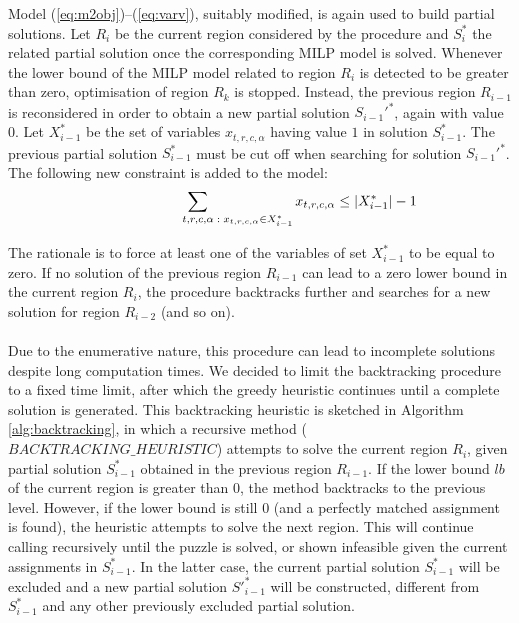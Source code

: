 \documentclass[preprint,12pt]{elsarticle}
\begin{document}
{Model (\ref{eq:m2obj})--(\ref{eq:varv}), suitably modified, is again used to build partial solutions.
Let $R_i$ be the current region considered by the procedure and $S_{i}^\ast$ the related partial solution once the corresponding MILP model is solved.
Whenever the lower bound of the MILP model related to region $R_i$ is detected to be greater than zero, optimisation of region $R_k$ is stopped.
Instead, the previous region $R_{i-1}$ is reconsidered in order to obtain a new partial solution 
$S_{i-1}'^\ast$, again with value $0$. Let $X_{i-1}^*$ be the set of variables ${x}_{t,r,c,\alpha}$
having value $1$ in solution $S_{i-1}^*$.
The previous partial solution $S_{i-1}^\ast$ must be cut off when searching for solution $S_{i-1}'^\ast$. The following new constraint is added to the model:
\begin{equation}
\sum_{\hspace*{2cm} t,r,c,\alpha \; : \; x_{t,r,c,\alpha} \in X_{i-1}^*}  x_{t,r,c,\alpha} \leq |X_{i-1}^*|-1 
\end{equation}

\noindent
The rationale is to force at least one of the variables of set $X_{i-1}^*$ to be equal to zero.
If no solution of the previous region $R_{i-1}$ can lead to a zero lower bound in the current region $R_i$, the procedure backtracks further and searches for a new solution for region $R_{i-2}$ (and so on). 
\\
\\
Due to the enumerative nature, this procedure can lead to incomplete solutions despite long computation times.
We decided to limit the backtracking procedure to a fixed time limit, after which the greedy heuristic continues until a complete solution is generated.
This backtracking heuristic is sketched in Algorithm \ref{alg:backtracking}, in which a recursive method ($BACKTRACKING\_HEURISTIC$) attempts to solve the current region $R_i$, given partial solution $S^\ast_{i-1}$ 
obtained in the previous region $R_{i-1}$.
If the lower bound $lb$ of the current region  is greater than 0, the method backtracks to the previous level.
However, if the lower bound is still $0$ (and a perfectly matched assignment is found), the heuristic attempts to solve the next region. This will continue calling recursively until the puzzle is solved, or shown infeasible given the current assignments in $S^\ast_{i-1}$.
In the latter case, the current partial solution $S^\ast_{i-1}$ will be excluded and a new partial solution $S'^\ast_{i-1}$ will be constructed, different from $S^\ast_{i-1}$ and any other previously excluded partial solution.

}
\end{document}
